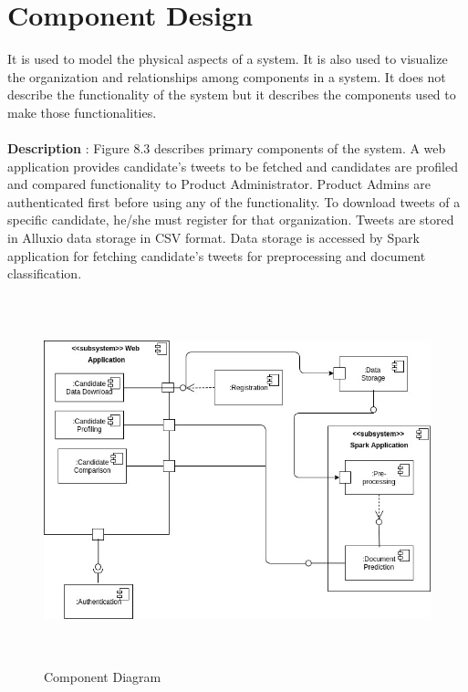 \documentclass[oneside,a4paper,12pt]{pictreport}
\begin{document}
\section{Component Design}
It is used to model the physical aspects of a system. It is also used to visualize the organization and relationships among components in a system. It does not describe the functionality of the system but it describes the components used to make those functionalities.\\\\
\textbf{Description} : Figure 8.3 describes primary components of the system. A web application provides candidate's tweets to be fetched and candidates are profiled and compared functionality to Product Administrator. Product Admins are authenticated first before using any of the functionality. To download tweets of a specific candidate, he/she must register for that organization. Tweets are stored in Alluxio data storage in CSV format. Data storage is accessed by Spark application for fetching candidate's tweets for preprocessing and document classification. 
\begin{figure}[h!]
\includegraphics[width=5.2in,height=4.2in]{component.jpg}
\caption{Component Diagram}
\end{figure}
\end{document}
